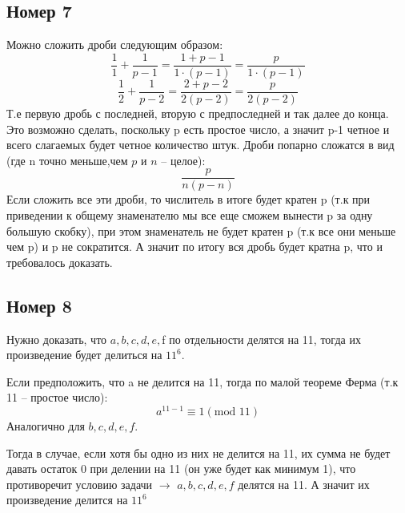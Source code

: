 \documentclass[a4paper,12pt]{article}
\begin{document}
\subsection*{Номер 7}
Можно сложить дроби следующим образом:
\[
\frac{1}{1} + \frac{1}{p-1} = \frac{1 + p -1 }{1 \cdot (p-1)} = \frac{p}{1 \cdot (p-1)}
\]
\[
\frac{1}{2} + \frac{1}{p-2} = \frac{2 + p - 2}{2(p-2)} = \frac{p}{2(p-2)}
\]
Т.е первую дробь с последней, вторую с предпоследней и так далее до конца. Это возможно сделать, поскольку p есть простое число, а значит p-1 четное и всего слагаемых будет четное количество штук. Дроби попарно сложатся в вид (где n точно меньше,чем $p$ и $n$ -- целое):
\[
\frac{p}{n(p-n)}
\]
Если сложить все эти дроби, то числитель в итоге будет кратен p (т.к при приведении к общему знаменателю мы все еще сможем вынести p за одну большую скобку), при этом знаменатель не будет кратен p (т.к все они меньше чем p) и p не сократится. А значит по итогу вся дробь будет кратна p, что и требовалось доказать.

\newpage
\subsection*{Номер 8}
Нужно доказать, что $a, b, c, d, e,$f по отдельности делятся на 11, тогда их произведение будет делиться на $11^6$. 

Если предположить, что  a не делится на 11, тогда по малой теореме Ферма (т.к 11 -- простое число):
\[
a^{11 - 1} \equiv 1 (\text{mod } 11)
\]
Аналогично для $b, c, d, e, f$. 

Тогда в случае, если хотя бы одно из них не делится на 11, их сумма не будет давать остаток 0 при делении на 11 (он уже будет как минимум 1), что противоречит условию задачи $\rightarrow$ $a, b, c, d, e, f$ делятся на 11. А значит их произведение делится на $11^6$
\end{document}

